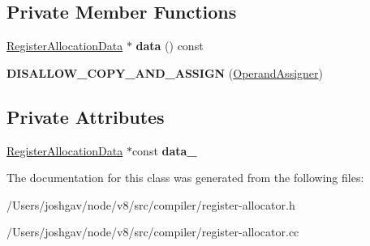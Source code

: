\subsection*{Private Member Functions}
\begin{DoxyCompactItemize}
\item 
\hyperlink{classv8_1_1internal_1_1compiler_1_1_register_allocation_data}{Register\+Allocation\+Data} $\ast$ {\bfseries data} () const \hypertarget{classv8_1_1internal_1_1compiler_1_1_operand_assigner_aa8996bf8f818acacb0a811f45d356e86}{}\label{classv8_1_1internal_1_1compiler_1_1_operand_assigner_aa8996bf8f818acacb0a811f45d356e86}

\item 
{\bfseries D\+I\+S\+A\+L\+L\+O\+W\+\_\+\+C\+O\+P\+Y\+\_\+\+A\+N\+D\+\_\+\+A\+S\+S\+I\+GN} (\hyperlink{classv8_1_1internal_1_1compiler_1_1_operand_assigner}{Operand\+Assigner})\hypertarget{classv8_1_1internal_1_1compiler_1_1_operand_assigner_a310e844a35690b412a50bf25aba544f1}{}\label{classv8_1_1internal_1_1compiler_1_1_operand_assigner_a310e844a35690b412a50bf25aba544f1}

\end{DoxyCompactItemize}
\subsection*{Private Attributes}
\begin{DoxyCompactItemize}
\item 
\hyperlink{classv8_1_1internal_1_1compiler_1_1_register_allocation_data}{Register\+Allocation\+Data} $\ast$const {\bfseries data\+\_\+}\hypertarget{classv8_1_1internal_1_1compiler_1_1_operand_assigner_a0d4dfd13e4aa64d84fe6ee5584e6276a}{}\label{classv8_1_1internal_1_1compiler_1_1_operand_assigner_a0d4dfd13e4aa64d84fe6ee5584e6276a}

\end{DoxyCompactItemize}


The documentation for this class was generated from the following files\+:\begin{DoxyCompactItemize}
\item 
/\+Users/joshgav/node/v8/src/compiler/register-\/allocator.\+h\item 
/\+Users/joshgav/node/v8/src/compiler/register-\/allocator.\+cc\end{DoxyCompactItemize}
